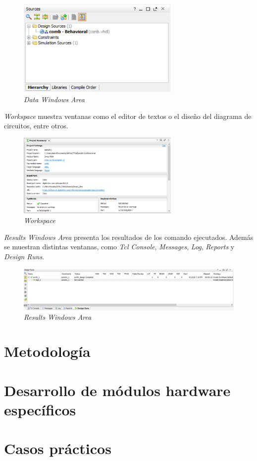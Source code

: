 \begin{figure}[H]
    \centering
    \includegraphics[width = 0.7\textwidth]{imagenes/datawa.png}
    \caption{\textit{Data Windows Area}}\label{data}
\end{figure}

\textit{Workspace} muestra ventanas como el editor de textos o el diseño del diagrama de circuitos, entre otros.

\begin{figure}[H]
    \centering
    \includegraphics[width = 0.7\textwidth]{imagenes/workspace.png}
    \caption{\textit{Workspace}}\label{workspace}
\end{figure}

\textit{Results Windows Area} presenta los resultados de los comando ejecutados. Además se muestran distintas ventanas, como 
\textit{Tcl Console}, \textit{Messages}, \textit{Log}, \textit{Reports} y \textit{Design Runs}.

\begin{figure}[H]
    \centering
    \includegraphics[width = 1\textwidth]{imagenes/statusbar.png}
    \caption{\textit{Results Windows Area}}\label{status}
\end{figure}

\section{Metodología}

\section{Desarrollo de módulos hardware específicos}

\section{Casos prácticos}
